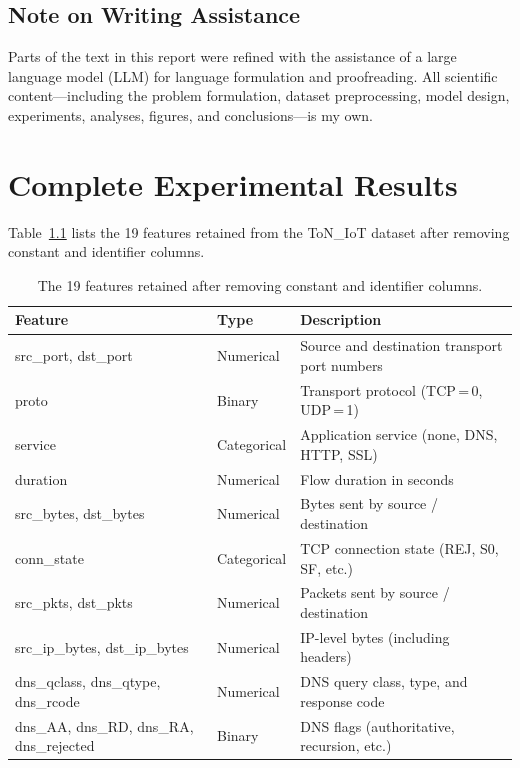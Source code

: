 \documentclass[twoside,openany,a4paper,11pt,english]{report}
\newcommand{\blankpage}{%
    \clearpage
    \thispagestyle{empty}%
    \null
    \clearpage
}
\begin{document}
\section*{Note on Writing Assistance}

Parts of the text in this report were refined with the assistance of a large language model (LLM) for language formulation and proofreading. All scientific content---including the problem formulation, dataset preprocessing, model design, experiments, analyses, figures, and conclusions---is my own.


\blankpage
\appendix

\chapter{Complete Experimental Results}
\label{app:full_results}

Table~\ref{tab:features} lists the 19 features retained from the ToN\_IoT dataset after removing constant and identifier columns.

\begin{table}[ht]
    \centering
    \small
    \begin{tabular}{llp{7.5cm}}
        \toprule
        \textbf{Feature} & \textbf{Type} & \textbf{Description} \\
        \midrule
        src\_port, dst\_port  & Numerical & Source and destination transport port numbers \\
        proto                & Binary    & Transport protocol (TCP\,=\,0, UDP\,=\,1) \\
        service              & Categorical & Application service (none, DNS, HTTP, SSL) \\
        duration             & Numerical & Flow duration in seconds \\
        src\_bytes, dst\_bytes & Numerical & Bytes sent by source / destination \\
        conn\_state           & Categorical & TCP connection state (REJ, S0, SF, etc.) \\
        src\_pkts, dst\_pkts   & Numerical & Packets sent by source / destination \\
        src\_ip\_bytes, dst\_ip\_bytes & Numerical & IP-level bytes (including headers) \\
        dns\_qclass, dns\_qtype, dns\_rcode & Numerical & DNS query class, type, and response code \\
        dns\_AA, dns\_RD, dns\_RA, dns\_rejected & Binary & DNS flags (authoritative, recursion, etc.) \\
        \bottomrule
    \end{tabular}
    \caption{The 19 features retained after removing constant and identifier columns.}
    \label{tab:features}
\end{table}
\end{document}
